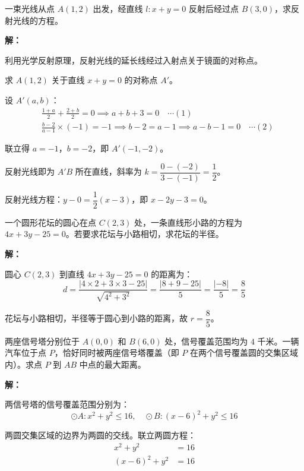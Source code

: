 \documentclass[12pt, a4paper]{ctexart}
\begin{document}
\begin{appbox}[【应用1】光线反射问题]
一束光线从点 $A(1, 2)$ 出发，经直线 $l: x + y = 0$ 反射后经过点 $B(3, 0)$，求反射光线的方程。
\end{appbox}

\textbf{解：}

利用光学反射原理，反射光线的延长线经过入射点关于镜面的对称点。

求 $A(1, 2)$ 关于直线 $x + y = 0$ 的对称点 $A'$。

设 $A'(a, b)$：
\begin{align*}
&\frac{1+a}{2} + \frac{2+b}{2} = 0 \implies a + b + 3 = 0 \quad \cdots (1)\\
&\frac{b-2}{a-1} \times (-1) = -1 \implies b - 2 = a - 1 \implies a - b - 1 = 0 \quad \cdots (2)
\end{align*}

联立得 $a = -1$，$b = -2$，即 $A'(-1, -2)$。

反射光线即为 $A'B$ 所在直线，斜率为 $k = \dfrac{0 - (-2)}{3 - (-1)} = \dfrac{1}{2}$。

反射光线方程：$y - 0 = \dfrac{1}{2}(x - 3)$，即 $\boxed{x - 2y - 3 = 0}$。

\bigskip

\begin{appbox}[【应用2】圆形花坛设计]
一个圆形花坛的圆心在点 $C(2, 3)$ 处，一条直线形小路的方程为 $4x + 3y - 25 = 0$。若要求花坛与小路相切，求花坛的半径。
\end{appbox}

\textbf{解：}

圆心 $C(2, 3)$ 到直线 $4x + 3y - 25 = 0$ 的距离为：
\[
d = \frac{|4 \times 2 + 3 \times 3 - 25|}{\sqrt{4^2 + 3^2}} = \frac{|8 + 9 - 25|}{5} = \frac{|-8|}{5} = \frac{8}{5}
\]

花坛与小路相切，半径等于圆心到小路的距离，故 $r = \boxed{\dfrac{8}{5}}$。

\bigskip

\begin{appbox}[【应用3】导航定位问题]
两座信号塔分别位于 $A(0, 0)$ 和 $B(6, 0)$ 处，信号覆盖范围均为 $4$ 千米。一辆汽车位于点 $P$，恰好同时被两座信号塔覆盖（即 $P$ 在两个信号覆盖圆的交集区域内）。求点 $P$ 到 $AB$ 中点的最大距离。
\end{appbox}

\textbf{解：}

两信号塔的信号覆盖范围分别为：
\[
\odot A: x^2 + y^2 \leqslant 16, \quad \odot B: (x - 6)^2 + y^2 \leqslant 16
\]

两圆交集区域的边界为两圆的交线。联立两圆方程：
\begin{align*}
x^2 + y^2 &= 16 \\
(x-6)^2 + y^2 &= 16
\end{align*}
\end{document}
